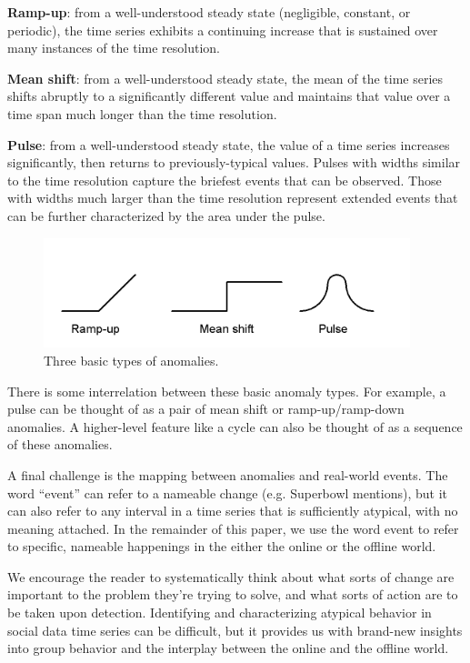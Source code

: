\documentclass{article}
\begin{document}
\textbf{Ramp-up}: from a well-understood steady state (negligible, constant, or
periodic), the time series exhibits a continuing increase that is sustained
over many instances of the time resolution. 

\textbf{Mean shift}: from a well-understood steady state, the mean of the time
series shifts abruptly to a significantly different value and maintains that
value over a time span much longer than the time resolution. 

\textbf{Pulse}: from a well-understood steady state, the value of a time series
increases significantly, then returns to previously-typical values.
Pulses with widths similar to the time resolution capture the briefest
events that can be observed. Those with widths much larger than 
the time resolution represent extended events that can be further
characterized by the area under the pulse.

\begin{figure}[ht]
\begin{center}
\includegraphics[width=0.95\textwidth]{fig/anomalies.png}
\caption{Three basic types of anomalies.}
\label{fig:anomalies}
\end{center}
\end{figure}

There is some interrelation between these basic anomaly types. For example, a
pulse can be thought of as a pair of mean shift or ramp-up/ramp-down anomalies.
A higher-level feature like a cycle can also be thought of as a sequence of
these anomalies. 
    
A final challenge is the mapping between anomalies and real-world events. The
word ``event'' can refer to a nameable change (e.g. Superbowl mentions), but it can
also refer to any interval in a time series that is sufficiently atypical, with
no meaning attached. In the remainder of this paper, we use the word event to
refer to specific, nameable happenings in the either the online or the offline world. 

We encourage the reader to systematically think about what sorts of change
are important to the problem they're trying to solve, and what sorts of
action are to be taken upon detection. Identifying and characterizing
atypical behavior in social data time series can be difficult, but it
provides us with brand-new insights into group behavior and the interplay
between the online and the offline world.  
\end{document}
